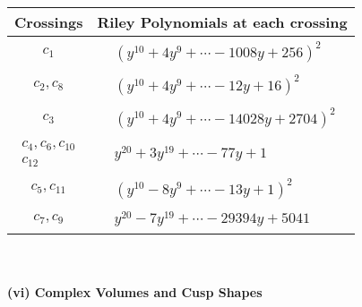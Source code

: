 \documentclass[1p]{elsarticle_modified}
\theoremstyle{definition}
\begin{document}
\begin{tabular}{m{50pt}|m{274pt}}
Crossings & \hspace{64pt}Riley Polynomials at each crossing \\
\hline $$\begin{aligned}c_{1}\end{aligned}$$&$\begin{aligned}
&(y^{10}+4 y^9+\cdots-1008 y+256)^{2}
\end{aligned}$\\
\hline $$\begin{aligned}c_{2},c_{8}\end{aligned}$$&$\begin{aligned}
&(y^{10}+4 y^9+\cdots-12 y+16)^{2}
\end{aligned}$\\
\hline $$\begin{aligned}c_{3}\end{aligned}$$&$\begin{aligned}
&(y^{10}+4 y^9+\cdots-14028 y+2704)^{2}
\end{aligned}$\\
\hline $$\begin{aligned}c_{4},c_{6},c_{10}\\c_{12}\end{aligned}$$&$\begin{aligned}
&y^{20}+3 y^{19}+\cdots-77 y+1
\end{aligned}$\\
\hline $$\begin{aligned}c_{5},c_{11}\end{aligned}$$&$\begin{aligned}
&(y^{10}-8 y^9+\cdots-13 y+1)^{2}
\end{aligned}$\\
\hline $$\begin{aligned}c_{7},c_{9}\end{aligned}$$&$\begin{aligned}
&y^{20}-7 y^{19}+\cdots-29394 y+5041
\end{aligned}$\\
\hline
\end{tabular}\\~\\
\newpage\flushleft \textbf{(vi) Complex Volumes and Cusp Shapes}
\end{document}
